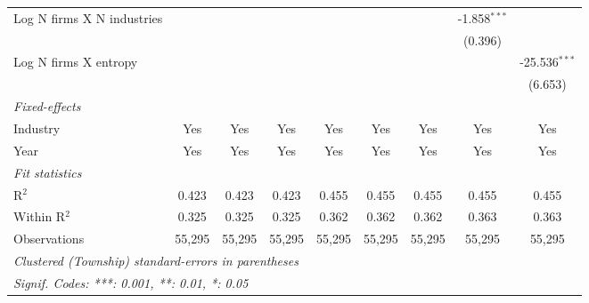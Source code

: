 \begin{tabular}{lcccccccc}
   Log N firms X N industries                            &                 &                 &                 &                  &                  &                  & -1.858$^{***}$   &   \\   
                                                         &                 &                 &                 &                  &                  &                  & (0.396)          &   \\   
   Log N firms X entropy                                 &                 &                 &                 &                  &                  &                  &                  & -25.536$^{***}$\\   
                                                         &                 &                 &                 &                  &                  &                  &                  & (6.653)\\   
   \midrule
   \emph{Fixed-effects}\\
   Industry                                              & Yes             & Yes             & Yes             & Yes              & Yes              & Yes              & Yes              & Yes\\  
   Year                                                  & Yes             & Yes             & Yes             & Yes              & Yes              & Yes              & Yes              & Yes\\  
   \midrule
   \emph{Fit statistics}\\
   R$^2$                                                 & 0.423           & 0.423           & 0.423           & 0.455            & 0.455            & 0.455            & 0.455            & 0.455\\  
   Within R$^2$                                          & 0.325           & 0.325           & 0.325           & 0.362            & 0.362            & 0.362            & 0.363            & 0.363\\  
   Observations                                          & 55,295          & 55,295          & 55,295          & 55,295           & 55,295           & 55,295           & 55,295           & 55,295\\  
   \midrule \midrule
   \multicolumn{9}{l}{\emph{Clustered (Township) standard-errors in parentheses}}\\
   \multicolumn{9}{l}{\emph{Signif. Codes: ***: 0.001, **: 0.01, *: 0.05}}\\
\end{tabular}
\par\endgroup
